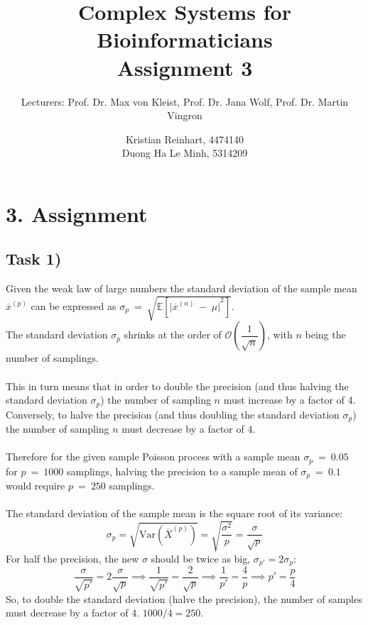 \documentclass[]{scrartcl}
\title{Complex Systems for Bioinformaticians \\ \vspace{2mm} Assignment 3 \\ \vspace{2mm}}
\subtitle{Lecturers: Prof. Dr. Max von Kleist, Prof. Dr. Jana Wolf, Prof. Dr. Martin Vingron}
\author{Kristian Reinhart, 4474140 \\ Duong Ha Le Minh, 5314209}
\begin{document}
\maketitle




\section*{3. Assignment}


\subsection*{Task 1)}

Given the weak law of large numbers the standard deviation of the sample mean $\overline{x}^{(p)}$ can be expressed as
$\sigma_{p} ~ = ~ \sqrt{\mathbb{E} \left[ { \vert \overline{x}^{(n)} ~ - ~ \mu \vert }^{2} \right] }$.
\\
The standard deviation $\sigma_{p}$ shrinks at the order of $\mathcal{O} \left( \dfrac{1}{\sqrt{n}} \right)$, with $n$ being the number of samplings.
\\
\\
This in turn means that in order to double the precision (and thus halving the standard deviation $\sigma_{p}$) the number of sampling $n$ must increase by a factor of 4.
Conversely, to halve the precision (and thus doubling the standard deviation $\sigma_{p}$) the number of sampling $n$ must decrease by a factor of 4.
\\
\\
Therefore for the given sample Poisson process with a sample mean  $\sigma_{p}~=~0.05$ for $p~=~1000$ samplings, halving the precision to a sample mean of  $\sigma_{p}~=~0.1$ would require $p~=~250$ samplings. 
\\
\\
The standard deviation of the sample mean is the square root of its variance:
\[
\sigma_p = \sqrt{\text{Var}(\overline{X}^{(p)})} = \sqrt{\frac{\sigma^2}{p}} = \frac{\sigma}{\sqrt{p}}
\]
For half the precision, the new $\sigma$ should be twice as big,
$\sigma_{p'} = 2 \sigma_p$:
\[
\frac{\sigma}{\sqrt{p'}} = 2 \frac{\sigma}{\sqrt{p}} \implies \frac{1}{\sqrt{p'}} = \frac{2}{\sqrt{p}} \implies \frac{1}{p'} = \frac{4}{p} \implies p' = \frac{p}{4}
\]
So, to double the standard deviation (halve the precision), the number of samples must decrease by a factor of 4. $1000 / 4 = 250$.
\end{document}
